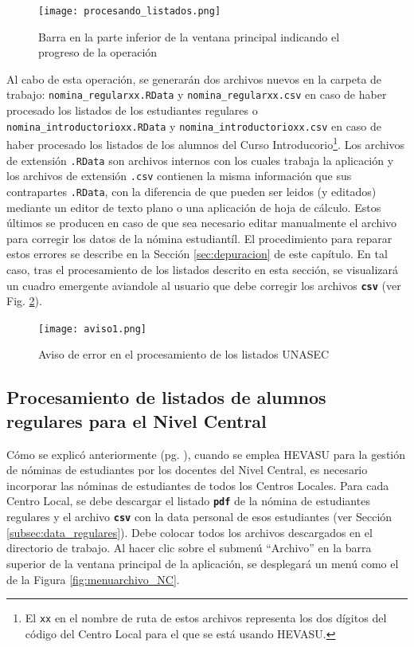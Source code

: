 \documentclass[letterpaper,12pt]{book}
\newcommand{\archivo}[1]
{\texttt{#1}}
\newcommand{\fileformat}[1]{\textbf{\texttt{#1}}}
\begin{document}
\begin{figure}[!ht]
  \centering
  \texttt{[image: procesando\_listados.png]}
  \caption{Barra en la parte inferior de la ventana principal indicando el progreso de la operación}
  \label{fig:procesando_listados}
\end{figure}

Al cabo de esta operación, se generarán dos archivos nuevos en la carpeta de trabajo: \archivo{nomina\_regularxx.RData} y \archivo{nomina\_regularxx.csv} en caso de haber procesado los listados de los estudiantes regulares o \archivo{nomina\_introductorioxx\-.RData} y \archivo{nomina\_introductorioxx.csv} en caso de haber procesado los listados de los alumnos del Curso Introducorio\footnote{El \texttt{xx} en el nombre de ruta de estos archivos representa los dos dígitos del código del Centro Local para el que se está usando HEVASU.}. Los archivos de extensión \texttt{.RData} son archivos internos con los cuales trabaja la aplicación y los archivos de extensión \texttt{.csv} contienen la misma información que sus contrapartes \texttt{.RData}, con la diferencia de que pueden ser leidos (y editados) mediante un editor de texto plano o una aplicación de hoja de cálculo. Estos últimos se producen en caso de que sea necesario editar manualmente el archivo para corregir los datos de la nómina estudiantíl. El procedimiento para reparar estos errores se describe en la Sección \ref{sec:depuracion} de este capítulo. En tal caso, tras el procesamiento de los listados descrito en esta sección, se visualizará un cuadro emergente aviandole al usuario que debe corregir los archivos \fileformat{csv} (ver Fig. \ref{fig:aviso1}).

\begin{figure}[!ht]
  \centering
  \texttt{[image: aviso1.png]}
  \caption{Aviso de error en el procesamiento de los listados UNASEC}
  \label{fig:aviso1}
\end{figure}

\subsection{Procesamiento de listados de alumnos regulares para el Nivel Central}

Cómo se explicó anteriormente (pg. \pageref{concepto:modo_NC}), cuando se emplea HEVASU para la gestión de nóminas de estudiantes por los docentes del Nivel Central, es necesario incorporar las nóminas de estudiantes de todos los Centros Locales. Para cada Centro Local, se debe descargar el listado \fileformat{pdf} de la nómina de estudiantes regulares y el archivo \fileformat{csv} con la data personal de esos estudiantes (ver Sección \ref{subsec:data_regulares}). Debe colocar todos los archivos descargados en el directorio de trabajo. Al hacer clic sobre el submenú ``Archivo'' en la barra superior de la ventana principal de la aplicación, se desplegará un menú como el de la Figura \ref{fig:menuarchivo_NC}.
\end{document}
